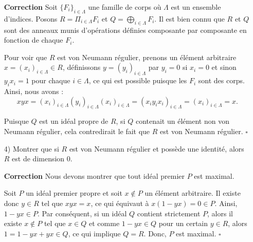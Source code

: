 \documentclass{article}
\begin{document}
\begin{itemize}
\noindent\textbf{Correction}
    Soit $ \{F_i\}_{i\in \Lambda} $ une famille de corps où $ \Lambda $ est un ensemble d'indices. Posons $ R=\Pi_{i\in\Lambda}F_i $ et $ Q=\bigoplus_{i\in\Lambda}F_i $. Il est bien connu que $ R $ et $ Q $ sont des anneaux munis d'opérations définies composante par composante en fonction de chaque $ F_i $.
    
    Pour voir que $ R $ est von Neumann régulier, prenons un élément arbitraire $ x=(x_i)_{i\in\Lambda}\in R $, définissons $ y=(y_i)_{i\in\Lambda} $ par $ y_i=0 $ si $ x_i=0 $ et sinon $ y_ix_i=1 $ pour chaque $ i\in\Lambda $, ce qui est possible puisque les $ F_i $ sont des corps. Ainsi, nous avons :
    $$ xyx=(x_i)_{i\in\Lambda}(y_i)_{i\in\Lambda}(x_i)_{i\in\Lambda}=(x_iy_ix_i)_{i\in\Lambda}=(x_i)_{i\in\Lambda}=x. $$
    
    Puisque $ Q $ est un idéal propre de $ R $, si $ Q $ contenait un élément non von Neumann régulier, cela contredirait le fait que $ R $ est von Neumann régulier. \hfill $\square$
     \item[4)]  Montrer que si $R$ est von Neumann régulier et possède une identité, alors $R$ est de dimension $0$.
     
\noindent\textbf{Correction}    
    Nous devons montrer que tout idéal premier $ P $ est maximal.
    
    Soit $ P $ un idéal premier propre et soit $ x\notin P $ un élément arbitraire. Il existe donc $ y\in R$ tel que $ xyx=x $, ce qui équivaut à $ x(1-yx)=0 \in P$. Ainsi, $ 1-yx\in P $. Par conséquent, si un idéal $ Q $ contient strictement $ P $, alors il existe $ x\notin P $ tel que $ x\in Q $ et comme $ 1-yx\in Q $ pour un certain $ y\in R $, alors $ 1=1-yx+yx\in Q $, ce qui implique $ Q=R $. Donc, $ P $ est maximal. \hfill $\square$
\end{itemize}
\end{document}
